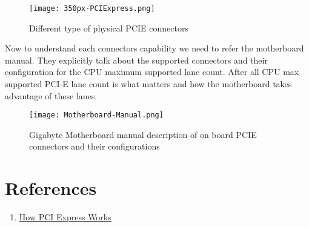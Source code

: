 \documentclass{article}
\begin{document}
\begin{figure}[H]
\centering
\texttt{[image: 350px-PCIExpress.png]}
\caption{Different type of physical PCIE connectors}
\end{figure}

Now to understand each connectors capability we need to refer the
motherboard manual. They explicitly talk about the supported
connectors and their configuration for the CPU maximum
supported lane count. After all CPU max supported PCI-E lane count
is what matters and how the motherboard takes advantage of these lanes.

\begin{figure}[H]
\centering
\texttt{[image: Motherboard-Manual.png]}
\caption{Gigabyte Motherboard manual description of on board PCIE connectors and their configurations}
\end{figure}


\section{References}
\begin{enumerate}[noitemsep]
\item \href{https://computer.howstuffworks.com/pci-express.htm}{How PCI Express Works}
\end{enumerate}
\end{document}
